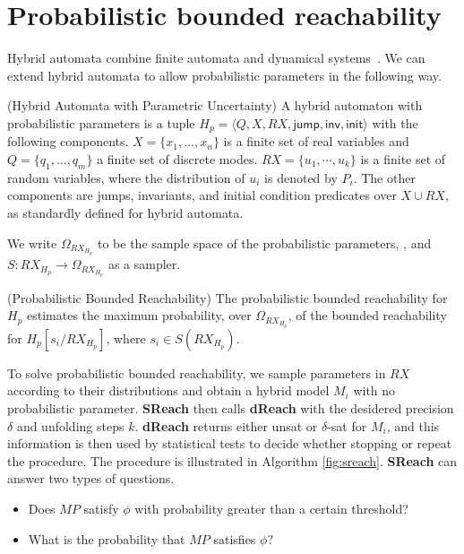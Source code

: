 \section{Probabilistic bounded reachability}

Hybrid automata combine finite automata and dynamical systems~\cite{henzinger2000theory}. We can extend hybrid automata to allow probabilistic parameters in the following way. 

\begin{definition}
\label{def:ha}
{\rm(Hybrid Automata with Parametric Uncertainty)} A hybrid automaton with probabilistic parameters is a tuple $H_p = \langle Q,X,RX,\mathsf{jump},\mathsf{inv},\mathsf{init}\rangle$
with the following components. $X = \{x_1,...,x_n\}$ is a finite set of real variables and $Q=\{q_1,...,q_m\}$ a finite set of discrete modes. $RX = \{ u_1, \cdots, u_k \}$ is a finite set of random variables, where the distribution of $u_i$ is denoted by $P_i$. The other components are jumps, invariants, and initial condition predicates over $X\cup RX$, as standardly defined for hybrid automata.
\end{definition}
We write $\Omega_{RX_{H_p}}$ to be the sample space of the probabilistic parameters, , and $S: RX_{H_p} \to \Omega_{RX_{H_p}}$ as a sampler.
\begin{definition}
\label{def:pbr}
{\rm (Probabilistic Bounded Reachability)}
The probabilistic bounded reachability for $H_p$ estimates the maximum probability, over $\Omega_{RX_{H_p}}$, of the bounded reachability for $H_{p}[s_i/RX_{H_p}]$, where $s_i \in S(RX_{H_p})$.
\end{definition}
To solve probabilistic bounded reachability, we sample parameters in $RX$ according 
to their distributions and obtain a hybrid model $M_i$ with no probabilistic 
parameter. {\bf SReach} then calls {\bf dReach} \cite{gaodelta} with the desidered precision $\delta$ and 
unfolding steps $k$. {\bf dReach} returns either unsat or $\delta$-sat for $M_i$, and this information
is then used by statistical tests to decide whether stopping or repeat the procedure. The procedure is illustrated in Algorithm \ref{fig:sreach}. {\bf SReach} can answer two types of questions. 
\begin{itemize}
\item Does $MP$ satisfy $\phi$ with probability
greater than a certain threshold? 
\item What is the probability that $MP$ satisfies $\phi$?
\end{itemize}
